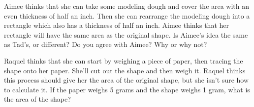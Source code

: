 \documentclass[nooutcomes,noauthor, handout]{ximera}
\begin{document}
\begin{problem}
Aimee thinks that she can take some modeling dough and cover the area with an even thickness of half an inch. Then she can rearrange the modeling dough into a rectangle which also has a thickness of half an inch. Aimee thinks that her rectangle will have the same area as the original shape. Is Aimee's idea the same as Tad's, or different? Do you agree with Aimee? Why or why not?
\end{problem}



\begin{problem}
Raquel thinks that she can start by weighing a piece of paper, then tracing the shape onto her paper. She'll cut out the shape and then weigh it. Raquel thinks this process should give her the area of the original shape, but she isn't sure how to calculate it. If the paper weighs 5 grams and the shape weighs 1 gram, what is the area of the shape?
\end{problem}



\newpage
\end{document}
